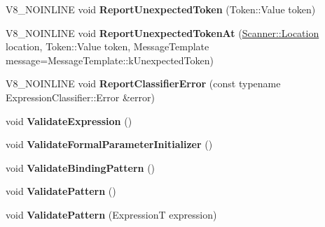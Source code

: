 \begin{DoxyCompactItemize}
\mbox{\label{classv8_1_1internal_1_1ParserBase_ae7114cc958957031ce5122e81ff80440}} 
V8\+\_\+\+N\+O\+I\+N\+L\+I\+NE void {\bfseries Report\+Unexpected\+Token} (Token\+::\+Value token)
\item 
\mbox{\label{classv8_1_1internal_1_1ParserBase_aed72b7858735fccb898730f09a1030a9}} 
V8\+\_\+\+N\+O\+I\+N\+L\+I\+NE void {\bfseries Report\+Unexpected\+Token\+At} (\mbox{\hyperlink{structv8_1_1internal_1_1Scanner_1_1Location}{Scanner\+::\+Location}} location, Token\+::\+Value token, Message\+Template message=Message\+Template\+::k\+Unexpected\+Token)
\item 
\mbox{\label{classv8_1_1internal_1_1ParserBase_abc54196a9e1a107e6a12d5b004b4b23a}} 
V8\+\_\+\+N\+O\+I\+N\+L\+I\+NE void {\bfseries Report\+Classifier\+Error} (const typename Expression\+Classifier\+::\+Error \&error)
\item 
\mbox{\label{classv8_1_1internal_1_1ParserBase_adb315ed2f8acc23afdcdf7deb4a332a6}} 
void {\bfseries Validate\+Expression} ()
\item 
\mbox{\label{classv8_1_1internal_1_1ParserBase_a6613bb3fa79f4532f99426fe788347fc}} 
void {\bfseries Validate\+Formal\+Parameter\+Initializer} ()
\item 
\mbox{\label{classv8_1_1internal_1_1ParserBase_ad6a8879b1f36ffb24cc029d50edc10c0}} 
void {\bfseries Validate\+Binding\+Pattern} ()
\item 
\mbox{\label{classv8_1_1internal_1_1ParserBase_a42846534e7f54746bdd6c10a303437a1}} 
void {\bfseries Validate\+Pattern} ()
\item 
\mbox{\label{classv8_1_1internal_1_1ParserBase_a1b00256a2c9824a8f39b7e040ac69c96}} 
void {\bfseries Validate\+Pattern} (ExpressionT expression)
\item 
\mbox{\label{classv8_1_1internal_1_1ParserBase_a290ac79688ef1d26b7c9341f17dde53b}} 

\end{DoxyCompactItemize}
